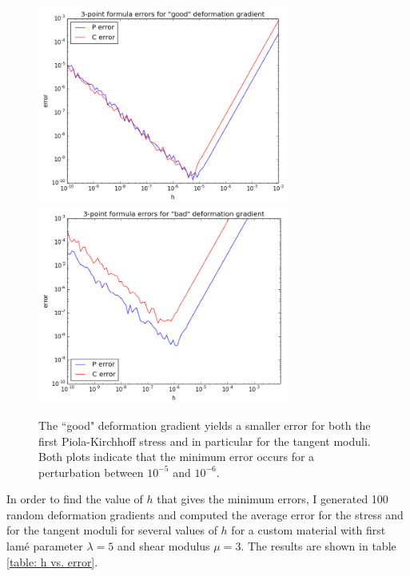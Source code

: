 \documentclass[]{spie}  %
\begin{document}
\begin{figure}[h]
\centering
\includegraphics[width=3.25in]{error_good_F.png} \quad
\includegraphics[width=3.25in]{error_bad_F.png} 
\caption{The ``good" deformation gradient yields a smaller error for both the first Piola-Kirchhoff stress and in particular for the tangent moduli. Both plots indicate that the minimum error occurs for a perturbation between $10^{-5}$ and $10^{-6}$.} 
\label{fig: numerical differentiation error}
\end{figure}

In order to find the value of $h$ that gives the minimum errors, I generated 100 random deformation gradients and computed the average error for the stress and for the tangent moduli for several values of $h$ for a custom material with first lam\'e parameter $\lambda = 5$ and shear modulus $\mu = 3$. The results are shown in table \ref{table: h vs. error}.
\end{document}
